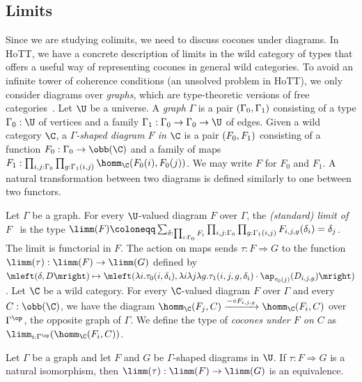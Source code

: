 \documentclass{lmcs}
\theoremstyle{definition}\newtheorem{note}[thm]{Note}
\begin{document}
\subsection*{Limits}

Since we are studying colimits, we need to discuss cocones under diagrams. In HoTT, we have a concrete description of limits in the wild category of types that offers a useful way of representing cocones in general wild categories.
To avoid an infinite tower of coherence conditions (an unsolved problem in HoTT), we only consider diagrams over \emph{graphs}, which are type-theoretic versions of free categories~\cite[Section 3.2]{CSL25}. Let $\U$ be a universe. A \emph{graph} $\Gamma$ is a pair $\mleft(\Gamma_0, \Gamma_1\mright)$ consisting of a type $\Gamma_0 : \U$ of vertices and a family $\Gamma_1 : \Gamma_0 \to \Gamma_0 \to \U$ of edges.
 Given a wild category $\C$, a \emph{$\Gamma$-shaped diagram $F$ in $\C$} is a pair $\mleft(F_0, F_1\mright)$ consisting of a function $F_0 : \Gamma_0 \to \obb(\C)$ and a family of maps $F_1 : \prod_{i,j : \Gamma_0}\prod_{g : \Gamma_1(i,j)}  \homm_{\C}(F_0(i) , F_0(j))$. We may write $F$ for $F_0$ and $F_1$. A natural transformation between two diagrams is defined similarly to one between two functors.

Let $\Gamma$ be a graph. For every $\U$-valued diagram $F$ over $\Gamma$, the \emph{(standard) limit of $F$}~\cite[Definition 4.2.7]{Avi} is the type $\limm(F)  \coloneqq \sum_{\delta : \prod_{i : \Gamma_0}F_i}\prod_{i,j : \Gamma_0}\prod_{g : \Gamma_1(i,j)} F_{i,j,g}(\delta_i) = \delta_j$. The limit is functorial in $F$. The action on maps sends $\tau : F \Rightarrow G$ to the function $\limm(\tau) : \limm(F) \to \limm(G)$ defined by $\mleft(\delta, D\mright) \mapsto \mleft(\lambda{i}.\tau_0(i, \delta_i), \lambda{i}\lambda{j}\lambda{g}.\tau_1(i,j,g, \delta_i) \cdot \ap_{\tau_0(j)}(D_{i,j,g}) \mright)$.
Let $\C$ be a wild category. For every $\C$-valued diagram $F$ over $\Gamma$ and every $C : \obb(\C)$, we have the diagram $\homm_{\C}(F_j, C) \xrightarrow{{-} \circ F_{i,j,g}} \homm_{\C}(F_i, C)$ over $\Gamma^{\op}$, the opposite graph of $\Gamma$. We define the type of \emph{cocones under $F$ on $C$} as $\limm_{i : \Gamma^{\op}}(\homm_{\C}(F_i , C))$.
\begin{lem} \label{limpreseq}
Let $\Gamma$ be a graph and let $F$ and $G$ be $\Gamma$-shaped diagrams in $\U$. If $\tau : F \Rightarrow G$ is a natural isomorphism, then $\limm(\tau) : \limm(F) \to \limm(G)$ is an equivalence. 
\end{lem}
\end{document}
